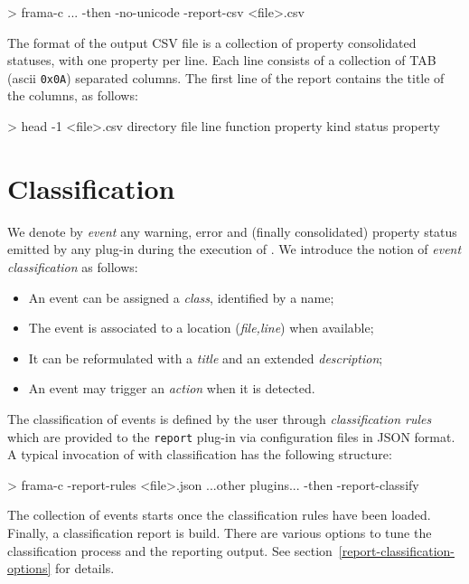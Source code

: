 \begin{logs}
> frama-c ... -then -no-unicode -report-csv <file>.csv
\end{logs}

The format of the output CSV file is a collection of property consolidated statuses, with one property per line.
Each line consists of a collection of TAB (ascii \verb+0x0A+) separated columns.
The first line of the report contains the title of the columns, as follows:

\begin{logs}
> head -1 <file>.csv
directory	file	line	function	property kind	status	property
\end{logs}

\section{Classification}

We denote by \textit{event} any warning, error and (finally consolidated) property status emitted by any plug-in
during the execution of \FramaC. We introduce the notion of \textit{event classification} as follows:
\begin{itemize}
\item An event can be assigned a \textit{class}, identified by a name;
\item The event is associated to a location (\textit{file,line}) when available;
\item It can be reformulated with a \textit{title} and an extended \textit{description};
\item An event may trigger an \textit{action} when it is detected.
\end{itemize}

The classification of events is defined by the user through \emph{classification rules}
which are provided to the \texttt{report} plug-in via configuration files in JSON format.
A typical invocation of \FramaC with classification has the following structure:

\begin{logs}
> frama-c -report-rules <file>.json ...other plugins... -then -report-classify
\end{logs}

The collection of events starts once the classification rules have been loaded.
Finally, a classification report is build. There are various options to tune the classification process
and the reporting output. See section~\ref{report-classification-options} for details.

